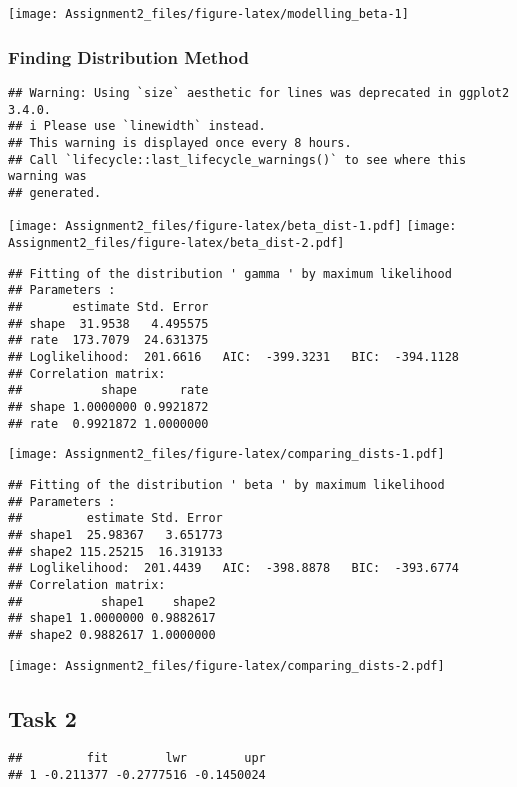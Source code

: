 \documentclass[
]{article}
\begin{document}
\begin{center}\texttt{[image: Assignment2\_files/figure-latex/modelling\_beta-1]} \end{center}

\subsubsection{Finding Distribution
Method}\label{finding-distribution-method}

\begin{verbatim}
## Warning: Using `size` aesthetic for lines was deprecated in ggplot2 3.4.0.
## i Please use `linewidth` instead.
## This warning is displayed once every 8 hours.
## Call `lifecycle::last_lifecycle_warnings()` to see where this warning was
## generated.
\end{verbatim}

\texttt{[image: Assignment2\_files/figure-latex/beta\_dist-1.pdf]}
\texttt{[image: Assignment2\_files/figure-latex/beta\_dist-2.pdf]}

\begin{verbatim}
## Fitting of the distribution ' gamma ' by maximum likelihood 
## Parameters : 
##       estimate Std. Error
## shape  31.9538   4.495575
## rate  173.7079  24.631375
## Loglikelihood:  201.6616   AIC:  -399.3231   BIC:  -394.1128 
## Correlation matrix:
##           shape      rate
## shape 1.0000000 0.9921872
## rate  0.9921872 1.0000000
\end{verbatim}

\texttt{[image: Assignment2\_files/figure-latex/comparing\_dists-1.pdf]}

\begin{verbatim}
## Fitting of the distribution ' beta ' by maximum likelihood 
## Parameters : 
##         estimate Std. Error
## shape1  25.98367   3.651773
## shape2 115.25215  16.319133
## Loglikelihood:  201.4439   AIC:  -398.8878   BIC:  -393.6774 
## Correlation matrix:
##           shape1    shape2
## shape1 1.0000000 0.9882617
## shape2 0.9882617 1.0000000
\end{verbatim}

\texttt{[image: Assignment2\_files/figure-latex/comparing\_dists-2.pdf]}

\subsection{Task 2}\label{task-2}

\begin{verbatim}
##         fit        lwr        upr
## 1 -0.211377 -0.2777516 -0.1450024
\end{verbatim}
\end{document}
